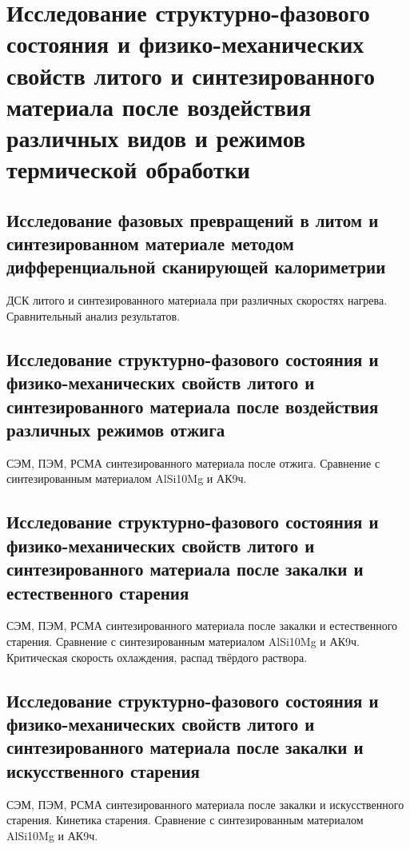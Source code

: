 \chapter{Исследование структурно-фазового состояния и физико-механических свойств литого и синтезированного материала после воздействия различных видов и режимов термической обработки}\label{ch:chapter6}

\section{Исследование фазовых превращений в литом и синтезированном материале методом дифференциальной сканирующей калориметрии}\label{sec:chapter6/section1}

ДСК литого и синтезированного материала при различных скоростях нагрева. Сравнительный анализ результатов.

\section{Исследование структурно-фазового состояния и физико-механических свойств литого и синтезированного материала после воздействия различных режимов отжига}\label{sec:chapter6/section2}

СЭМ, ПЭМ, РСМА синтезированного материала после отжига. Сравнение с синтезированным материалом AlSi10Mg и АК9ч.

\section{Исследование структурно-фазового состояния и физико-механических свойств литого и синтезированного материала после закалки и естественного старения}\label{sec:chapter6/section3}

СЭМ, ПЭМ, РСМА синтезированного материала после закалки и естественного старения. Сравнение с синтезированным материалом AlSi10Mg и АК9ч. Критическая скорость охлаждения, распад твёрдого раствора.

\section{Исследование структурно-фазового состояния и физико-механических свойств литого и синтезированного материала после закалки и искусственного старения}\label{sec:chapter6/section3}

СЭМ, ПЭМ, РСМА синтезированного материала после закалки и искусственного старения. Кинетика старения. Сравнение с синтезированным материалом AlSi10Mg и АК9ч.